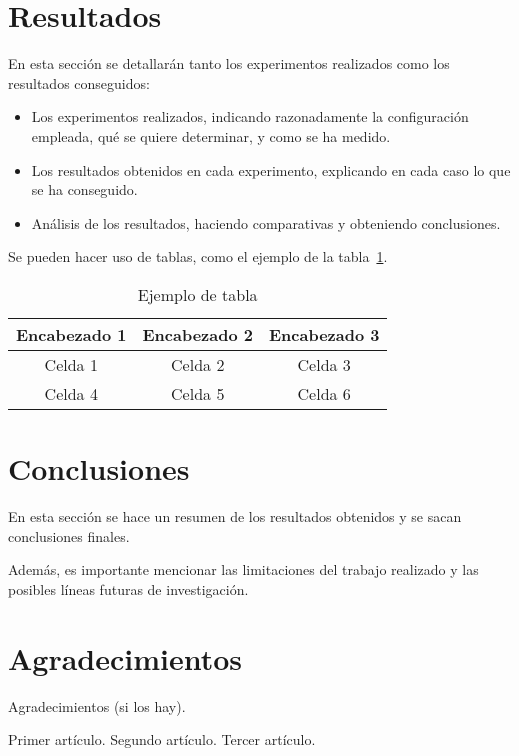 \documentclass[conference,a4paper]{IEEEtran}
\begin{document}
\section{Resultados}

En esta sección se detallarán tanto los experimentos realizados como los
resultados conseguidos:
\begin{itemize}
  \item Los experimentos realizados, indicando razonadamente la configuración
  empleada, qué se quiere determinar, y como se ha medido.
  \item Los resultados obtenidos en cada experimento, explicando en cada caso lo
  que se ha conseguido.
  \item Análisis de los resultados, haciendo comparativas y obteniendo
  conclusiones.
\end{itemize}

Se pueden hacer uso de tablas, como el ejemplo de la tabla~\ref{tab:ejemplo}.

\begin{table}
  \caption{Ejemplo de tabla}
  \label{tab:ejemplo}
  \centering
  \begin{tabular}{ccc}
    \toprule
    Encabezado 1 & Encabezado 2 & Encabezado 3 \\
    \midrule
    Celda 1 & Celda 2 & Celda 3 \\
    Celda 4 & Celda 5 & Celda 6 \\
    \bottomrule
  \end{tabular}
\end{table}

\section{Conclusiones}

En esta sección se hace un resumen de los resultados obtenidos y se sacan
conclusiones finales.

Además, es importante mencionar las limitaciones del trabajo realizado y
las posibles líneas futuras de investigación.

\section*{Agradecimientos}

Agradecimientos (si los hay).

\begin{thebibliography}{00}
   Primer artículo.
   Segundo artículo.
   Tercer artículo.
\end{thebibliography}
\end{document}
